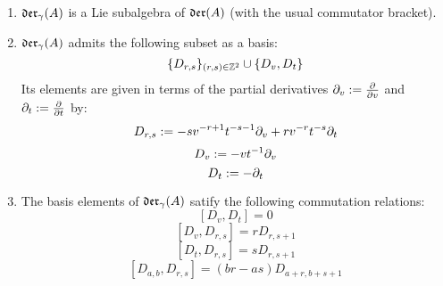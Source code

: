         \begin{lemma} \label{lemma: yangian_div_zero_vector_fields_basic_properties}
            \begin{enumerate}
                \item $\mathfrak{der}_{\gamma}(A)$ is a Lie subalgebra of $\mathfrak{der}(A)$ (with the usual commutator bracket).
                \item $\mathfrak{der}_{\gamma}(A)$ admits the following subset as a basis:
                    $$\{D_{r, s}\}_{(r, s) \in \mathbb{Z}^2} \cup \{D_v, D_t\}$$
                Its elements are given in terms of the partial derivatives $\partial_v := \frac{\partial}{\partial v}$ and $\partial_t := \frac{\partial}{\partial t}$ by:
                    $$D_{r, s} := -s v^{-r + 1} t^{-s - 1} \partial_v + r v^{-r} t^{-s} \partial_t$$
                    $$D_v := -v t^{-1} \partial_v$$
                    $$D_t := -\partial_t$$
                \item The basis elements of $\mathfrak{der}_{\gamma}(A)$ satify the following commutation relations:
                    $$[D_v, D_t] = 0$$
                    $$[D_v, D_{r, s}] = r D_{r, s + 1}$$
                    $$[D_t, D_{r, s}] = s D_{r, s + 1}$$
                    $$[D_{a, b}, D_{r, s}] = (br - as) D_{a + r, b + s + 1}$$
            \end{enumerate}
        \end{lemma}
